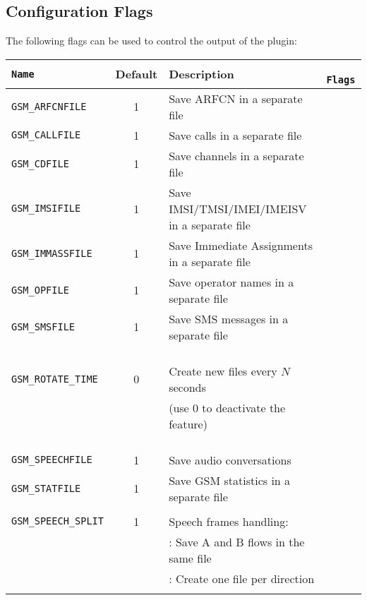 \documentclass[documentation]{subfiles}
\begin{document}
\subsection{Configuration Flags}
The following flags can be used to control the output of the plugin:
\begin{longtable}{>{\tt}lcl>{\tt\small}l}
    \toprule
    {\bf Name} & {\bf Default} & {\bf Description} & {\bf Flags}\\
    \midrule\endhead%
    GSM\_ARFCNFILE         & 1 & Save ARFCN in a separate file                      & \\
    GSM\_CALLFILE          & 1 & Save calls in a separate file                      & \\
    GSM\_CDFILE            & 1 & Save channels in a separate file                   & \\
    GSM\_IMSIFILE          & 1 & Save IMSI/TMSI/IMEI/IMEISV in a separate file      & \\
    GSM\_IMMASSFILE        & 1 & Save Immediate Assignments in a separate file      & \\
    GSM\_OPFILE            & 1 & Save operator names in a separate file             & \\
    GSM\_SMSFILE           & 1 & Save SMS messages in a separate file               & \\
                           &   &                                                    & \\
    GSM\_ROTATE\_TIME      & 0 & Create new files every $N$ seconds                 & \\
                           &   & (use 0 to deactivate the feature)                  & \\
                           &   &                                                    & \\
    GSM\_SPEECHFILE        & 1 & Save audio conversations                           & \\
    GSM\_STATFILE          & 1 & Save GSM statistics in a separate file             & \\
    \\
    GSM\_SPEECH\_SPLIT     & 1 & Speech frames handling:                            & \\
                           &   & \qquad 0: Save A and B flows in the same file      & \\
                           &   & \qquad 1: Create one file per direction            & \\
    \\

\end{longtable}
\end{document}

